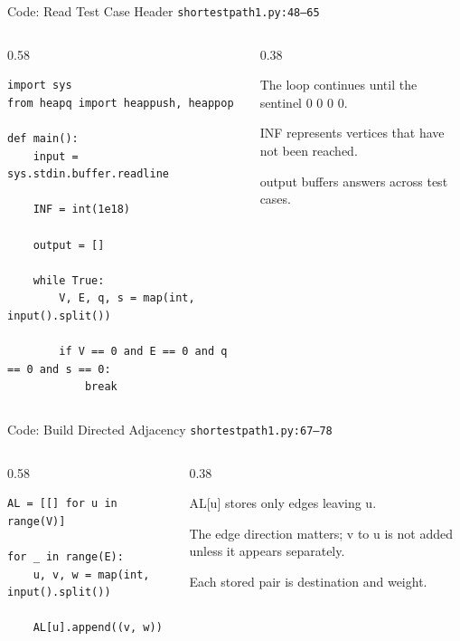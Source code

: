 \documentclass[aspectratio=169,11pt]{beamer}
\begin{document}
\begin{frame}[fragile]{Code: Read Test Case Header}
\scriptsize
{} \texttt{shortestpath1.py:48--65}

\vspace{0.08cm}
\begin{columns}[T,totalwidth=\textwidth]
\begin{column}{0.58\textwidth}
\begin{lstlisting}[style=cpcode]
import sys
from heapq import heappush, heappop

def main():
    input = sys.stdin.buffer.readline

    INF = int(1e18)

    output = []

    while True:
        V, E, q, s = map(int, input().split())

        if V == 0 and E == 0 and q == 0 and s == 0:
            break
\end{lstlisting}
\end{column}
\begin{column}{0.38\textwidth}
\begin{tightitemize}
  \item The loop continues until the sentinel 0 0 0 0.
  \item INF represents vertices that have not been reached.
  \item output buffers answers across test cases.
\end{tightitemize}
\end{column}
\end{columns}
\end{frame}

\begin{frame}[fragile]{Code: Build Directed Adjacency}
\scriptsize
{} \texttt{shortestpath1.py:67--78}

\vspace{0.08cm}
\begin{columns}[T,totalwidth=\textwidth]
\begin{column}{0.58\textwidth}
\begin{lstlisting}[style=cpcode]
AL = [[] for u in range(V)]

for _ in range(E):
    u, v, w = map(int, input().split())

    AL[u].append((v, w))
\end{lstlisting}
\end{column}
\begin{column}{0.38\textwidth}
\begin{tightitemize}
  \item AL[u] stores only edges leaving u.
  \item The edge direction matters; v to u is not added unless it appears separately.
  \item Each stored pair is destination and weight.
\end{tightitemize}
\end{column}
\end{columns}
\end{frame}
\end{document}
